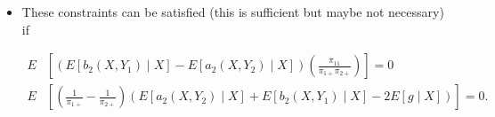 \begin{itemize}
  \item These constraints can be satisfied (this is sufficient but maybe not
    necessary) if 

    \begin{align*}
      E&\left[(E[b_2(X, Y_1) \mid X] - E[a_2(X, Y_2) \mid X])
      \left(\frac{\pi_{11}}{\pi_{1+} \pi_{2+}}\right) \right] = 0\\
      E&\left[\left(\frac{1}{\pi_{1+}} - \frac{1}{\pi_{2+}}\right)(E[a_2(X, Y_2)
      \mid X] + E[b_2(X, Y_1) \mid X] - 2E[g \mid X])\right] = 0.
    \end{align*}

\end{itemize}


\newpage
